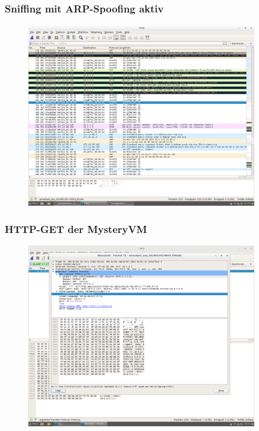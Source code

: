 \documentclass[12pt]{article}
\theoremstyle{plain}
\begin{document}
\subsubsection*{Sniffing mit ARP-Spoofing aktiv}
\begin{figure}[!ht]
	\centering
     \includegraphics[width=0.9\textwidth]{Bilder/sniffing_mit_arp.png}
\end{figure}
\newpage
\subsubsection*{HTTP-GET der MysteryVM}
\begin{figure}[!ht]
	\centering
     \includegraphics[width=0.9\textwidth]{Bilder/http_get_von_mysteryVM.png}
\end{figure}
\newpage
\end{document}
